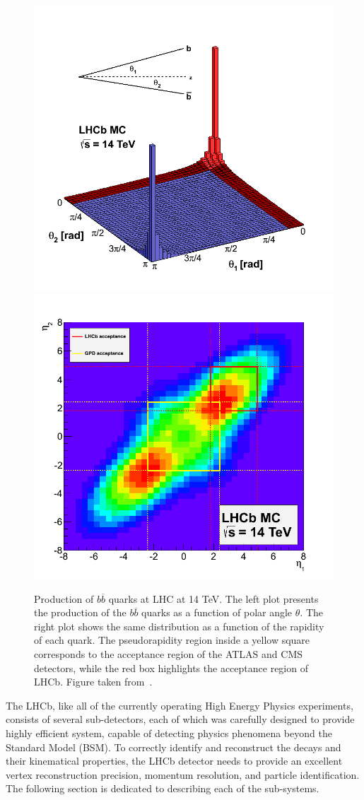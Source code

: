 \begin{figure}[h]
 \begin{center}
  \includegraphics[width=0.48\linewidth]{figures/bb_2.png}
   \includegraphics[width=0.48\linewidth]{figures/bb_1.png}
   \caption{Production of  $b \overline{b}$ quarks at LHC at 14 TeV. The left plot presents the production of the $b \overline{b}$ quarks as a function of polar angle $\theta$. The right plot shows the same distribution as a function of the rapidity of each quark. The pseudorapidity region inside a yellow square corresponds to the acceptance region of the ATLAS and CMS detectors, while the red box highlights the acceptance region of LHCb. Figure taken from~\cite{bbangles}. 
     \label{fig:bb}}
 \end{center}
\end{figure}


The LHCb, like all of the currently operating High Energy Physics experiments, consists of several sub-detectors, each of which was carefully designed to provide highly efficient system, capable of detecting physics phenomena beyond the Standard Model (BSM). To correctly identify and reconstruct the decays and their kinematical properties, the LHCb detector needs to provide an excellent vertex reconstruction precision, momentum resolution, and particle identification. The following section is dedicated to describing each of the sub-systems.

